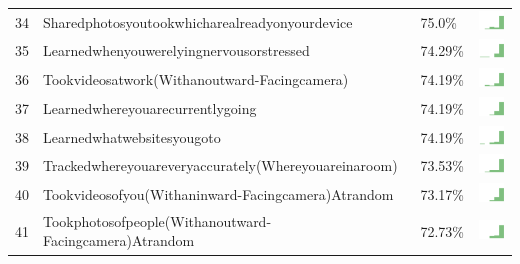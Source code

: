 \documentclass[a4paper,12pt]{article}
\begin{document}
\begin{longtable}{| p{0.5cm} | p{7cm} | p{1cm} | c |}
34 & Sharedphotosyoutookwhicharealreadyonyourdevice & 75.0\% & \includegraphics[width = 2cm, height = 0.5cm]{sharedphotosyoutookwhicharealreadyonyourdeviceFRIENDS} \\  
35 & Learnedwhenyouwerelyingnervousorstressed & 74.29\% & \includegraphics[width = 2cm, height = 0.5cm]{learnedwhenyouwerelyingnervousorstressedFRIENDS} \\  
36 & Tookvideosatwork(Withanoutward-Facingcamera) & 74.19\% & \includegraphics[width = 2cm, height = 0.5cm]{tookvideosatwork(withanoutward-facingcamera)FRIENDS} \\  
37 & Learnedwhereyouarecurrentlygoing & 74.19\% & \includegraphics[width = 2cm, height = 0.5cm]{learnedwhereyouarecurrentlygoingFRIENDS} \\  
38 & Learnedwhatwebsitesyougoto & 74.19\% & \includegraphics[width = 2cm, height = 0.5cm]{learnedwhatwebsitesyougotoFRIENDS} \\  
39 & Trackedwhereyouareveryaccurately(Whereyouareinaroom) & 73.53\% & \includegraphics[width = 2cm, height = 0.5cm]{trackedwhereyouareveryaccurately(whereyouareinaroom)FRIENDS} \\  
40 & Tookvideosofyou(Withaninward-Facingcamera)Atrandom & 73.17\% & \includegraphics[width = 2cm, height = 0.5cm]{tookvideosofyou(withaninward-facingcamera)atrandomFRIENDS} \\  
41 & Tookphotosofpeople(Withanoutward-Facingcamera)Atrandom & 72.73\% & \includegraphics[width = 2cm, height = 0.5cm]{tookphotosofpeople(withanoutward-facingcamera)atrandomFRIENDS} \\  

\end{longtable}
\end{document}
